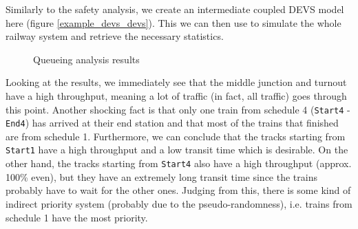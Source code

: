 \documentclass{article}
\begin{document}
Similarly to the safety analysis, we create an intermediate coupled DEVS model here (figure \ref{example_devs_devs}). This we can then use to simulate the whole railway system and retrieve the necessary statistics.

\begin{figure}[H]
    \begin{center}
    \end{center}
    \caption{Queueing analysis results}
    \label{example_devs_results}
\end{figure}

Looking at the results, we immediately see that the middle junction and turnout have a high throughput, meaning a lot of traffic (in fact, all traffic) goes through this point. Another shocking fact is that only one train from schedule 4 (\texttt{Start4} - \texttt{End4}) has arrived at their end station and that most of the trains that finished are from schedule 1. Furthermore, we can conclude that the tracks starting from \texttt{Start1} have a high throughput and a low transit time which is desirable. On the other hand, the tracks starting from \texttt{Start4} also have a high throughput (approx. 100\% even), but they have an extremely long transit time since the trains probably have to wait for the other ones. Judging from this, there is some kind of indirect priority system (probably due to the pseudo-randomness), i.e. trains from schedule 1 have the most priority.
\end{document}
